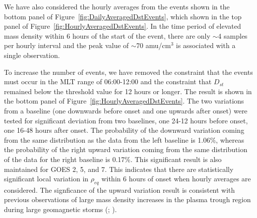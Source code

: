 \documentclass[12pt]{article}
\begin{document}
We have also considered the hourly averages from the events shown in the bottom panel of Figure~\ref{fig:DailyAveragedDstEvents}, which shown in the top panel of Figure~\ref{fig:HourlyAveragedDstEvents}.  In the time period of elevated mass density within 6 hours of the start of the event, there are only $\sim$4 samples per hourly interval and the peak value of $\sim$70 amu/cm$^3$ is associated with a single observation. 

To increase the number of events, we have removed the constraint that the events must occur in the MLT range of 06:00-12:00 and the constraint that $D_{st}$ remained below the threshold value for 12 hours or longer.  The result is shown in the bottom panel of Figure~\ref{fig:HourlyAveragedDstEvents}. The two variations from a baseline (one downwards before onset and one upwards after onset) were tested for significant deviation from two baselines, one 24-12 hours before onset, one 16-48 hours after onset. The probability of the downward variation coming from the same distribution as the data from the left baseline is 1.06\%, whereas the probability of the right upward variation coming from the same distribution of the data for the right baseline is 0.17\%.  This significant result is also maintained for GOES 2, 5, and 7.  This indicates that there are statistically significant local variation in $\rho_{eq}$ within 6 hours of onset when hourly averages are considered.  The signficance of the upward variation result is consistent with previous observations of large mass density increases in the plasma trough region during large geomagnetic storms (\cite{Yao2008}; \cite{Takahashi2010}).  


\end{document}
